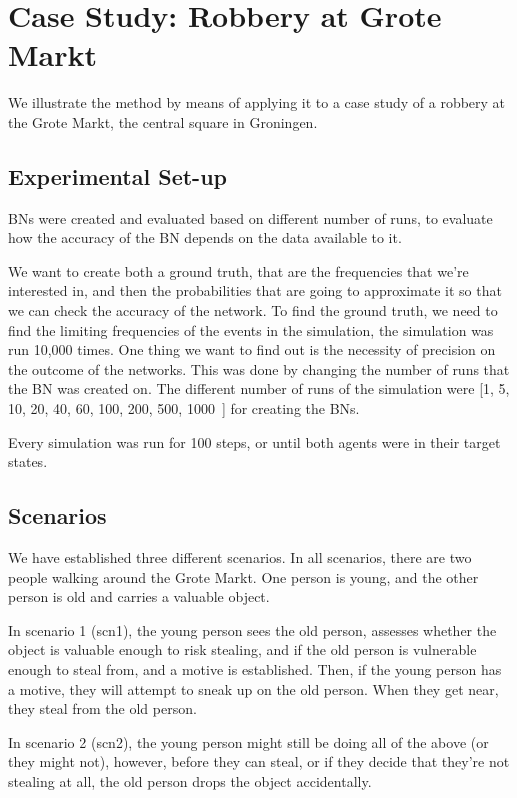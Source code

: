 \documentclass[12pt]{article}
\begin{document}
\newpage


\section{Case Study: Robbery at Grote Markt}
We illustrate the method by means of applying it to a case study of a robbery at the Grote Markt, the central square in Groningen.

\subsection{Experimental Set-up}
BNs were created and evaluated based on different number of runs, to evaluate how the accuracy of the BN depends on the data available to it. 

We want to create both a ground truth, that are the frequencies that we're interested in, and then the probabilities that are going to approximate it so that we can check the accuracy of the network. To find the ground truth, we need to find the limiting frequencies of the events in the simulation, the simulation was run 10,000 times. One thing we want to find out is the necessity of precision on the outcome of the networks. This was done by changing the number of runs that the BN was created on. The different number of runs of the simulation were [1, 5, 10, 20, 40, 60, 100, 200, 500, 1000~] for creating the BNs.


Every simulation was run for 100 steps, or until both agents were in their target states. 


\subsection{Scenarios}


We have established three different scenarios. In all scenarios, there are two people walking around the Grote Markt. One person is young, and the other person is old and carries a valuable object. 

In scenario 1 (scn1), the young person sees the old person, assesses whether the object is valuable enough to risk stealing, and if the old person is vulnerable enough to steal from, and a motive is established. Then, if the young person has a motive, they will attempt to sneak up on the old person. When they get near, they steal from the old person.

In scenario 2 (scn2), the young person might still be doing all of the above (or they might not), however, before they can steal, or if they decide that they're not stealing at all, the old person drops the object accidentally.
\end{document}
